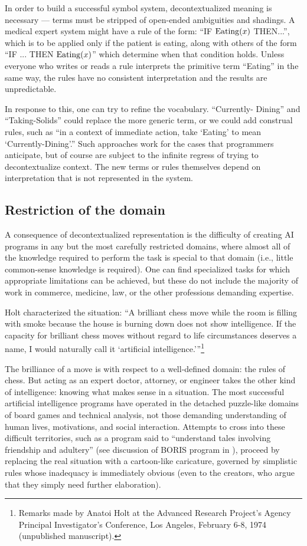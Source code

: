 \documentclass[12pt]{article}
\begin{document}
In order to build a successful symbol system, decontextualized meaning is necessary --- terms must be stripped of open-ended ambiguities and shadings. A medical expert system might have a rule of the form: ``IF $\mathop{\rm Eating}(x)$ THEN...'', which is to be applied only if the patient is eating, along with others of the form ``IF ... THEN $\mathop{\rm Eating}(x)$'' which determine when that condition holds. Unless everyone who writes or reads a rule interprets the primitive term ``Eating'' in the same way, the rules have no consistent interpretation and the results are unpredictable.

In response to this, one can try to refine the vocabulary. ``Currently- Dining'' and ``Taking-Solids'' could replace the more generic term, or we could add construal rules, such as ``in a context of immediate action, take `Eating' to mean `Currently-Dining'.'' Such approaches work for the cases that programmers anticipate, but of course are subject to the infinite regress of trying to decontextualize context. The new terms or rules themselves depend on interpretation that is not represented in the system.

\subsection{Restriction of the domain}

A consequence of decontextualized representation is the difficulty of creating AI programs in any but the most carefully restricted domains, where almost all of the knowledge required to perform the task is special to that domain (i.e., little common-sense knowledge is required). One can find specialized tasks for which appropriate limitations can be achieved, but these do not include the majority of work in commerce, medicine, law, or the other professions demanding expertise.

Holt characterized the situation: ``A brilliant chess move while the room is filling with smoke because the house is burning down does not show intelligence. If the capacity for brilliant chess moves without regard to life circumstances deserves a name, I would naturally call it `artificial intelligence.'''\footnote{Remarks made by Anatoi Holt at the Advanced Research Project's Agency
Principal Investigator's Conference, Los Angeles, February 6-8, 1974
(unpublished manuscript).}

The brilliance of a move is with respect to a well-defined domain: the rules of chess. But acting as an expert doctor, attorney, or engineer takes the other kind of intelligence: knowing what makes sense in a situation. The most successful artificial intelligence programs have operated in the detached puzzle-like domains of board games and technical analysis, not those demanding understanding of human lives, motivations, and social interaction. Attempts to cross into these difficult territories, such as a program said to ``understand tales involving friendship and adultery'' (see discussion of BORIS program in \cite{winograd-flores-1986}), proceed by replacing the real situation with a cartoon-like caricature, governed by simplistic rules whose inadequacy is immediately obvious (even to the creators, who argue that they simply need further elaboration).
\end{document}
